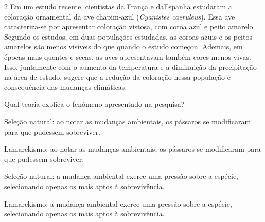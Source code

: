 
\num{2}  Em um estudo recente, cientistas da França e daEspanha estudaram a
  coloração ornamental da ave chapim-azul (\emph{Cyanistes caeruleus}).
 Essa ave caracteriza-se por apresentar coloração vistosa, com coroa azul e peito amarelo.
Segundo os estudos, em duas populações estudadas, as coroas azuis e os peitos amarelos
  são menos visíveis do que quando o estudo começou. Ademais, em épocas mais quentes e secas, as aves apresentavam também cores menos
  vivas. Isso, juntamente com o aumento da
  temperatura e a diminuição da precipitação na área de estudo, sugere que
  a redução da coloração nessa população é consequência das mudanças climáticas.


Qual teoria explica o fenômeno apresentado na pesquisa?

\begin{escolha}
\item
  Seleção natural: ao notar as mudanças ambientais, os pássaros se
  modificaram para que pudessem sobreviver.
\item
  Lamarckismo: ao notar as mudanças ambientais, os pássaros se
  modificaram para que pudessem sobreviver.
\item
  Seleção natural: a mudança ambiental exerce uma pressão sobre a
  espécie, selecionando apenas os mais aptos à sobrevivência.
\item
  Lamarckismo: a mudança ambiental exerce uma pressão sobre a espécie,
  selecionando apenas os mais aptos à sobrevivência.
\end{escolha}

